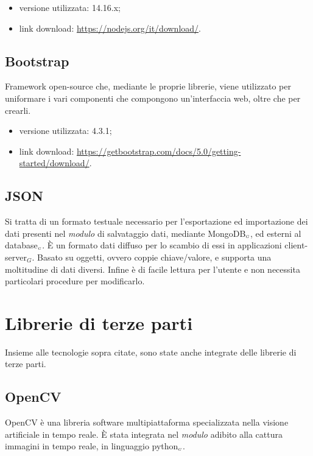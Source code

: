 \begin{itemize}
  \item versione utilizzata: 14.16.x;
  \item link download: \url{https://nodejs.org/it/download/}.
\end{itemize}

\subsection{Bootstrap}\label{TecnologieBootstrap}
Framework open-source che, mediante le proprie librerie, viene utilizzato per uniformare i vari componenti che compongono un'interfaccia web, oltre che per crearli.

\begin{itemize}
  \item versione utilizzata: 4.3.1;
  \item link download: \url{https://getbootstrap.com/docs/5.0/getting-started/download/}.
\end{itemize}


\subsection{JSON}\label{TecnologieJson}
Si tratta di un formato testuale necessario per l'esportazione ed importazione dei dati presenti nel \textit{modulo} di salvataggio dati, mediante MongoDB$_{\scaleto{G}{3pt}}$, ed esterni al database$_{\scaleto{G}{3pt}}$.
È un formato dati diffuso per lo scambio di essi in applicazioni client-server$_G$.
Basato su oggetti, ovvero coppie chiave/valore, e supporta una moltitudine di dati diversi. Infine è di facile lettura per l'utente e non necessita particolari procedure per modificarlo.


\section{Librerie di terze parti}\label{LibrerieDiTerzeParti}
Insieme alle tecnologie sopra citate, sono state anche integrate delle librerie di terze parti.

\subsection{OpenCV}\label{LibrerieOpenCV}
OpenCV è una libreria software multipiattaforma specializzata nella visione artificiale in tempo reale.
È stata integrata nel \textit{modulo} adibito alla cattura immagini in tempo reale, in linguaggio python$_{\scaleto{G}{3pt}}$.

